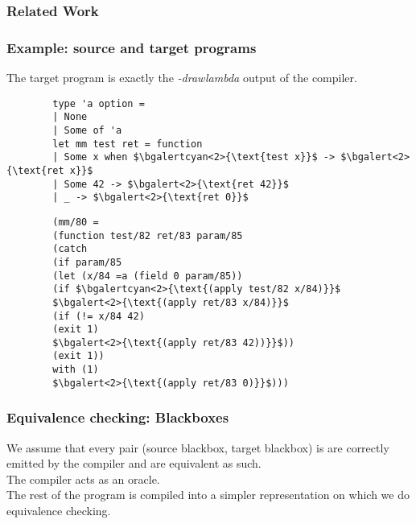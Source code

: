 \documentclass{beamer}
\begin{document}
\begin{frame}
  \frametitle{Related Work}
\end{frame}

\begin{frame}[fragile]
  \frametitle{Example: source and target programs}
  The target program is exactly the \emph{-drawlambda} output of the compiler.

  \begin{small}
    \hspace{-1em}
    \begin{minipage}{0.36\linewidth}
      \begin{lstlisting}
        type 'a option =
        | None
        | Some of 'a
        let mm test ret = function
        | Some x when $\bgalertcyan<2>{\text{test x}}$ -> $\bgalert<2>{\text{ret x}}$
        | Some 42 -> $\bgalert<2>{\text{ret 42}}$
        | _ -> $\bgalert<2>{\text{ret 0}}$
      \end{lstlisting}
    \end{minipage}
    \hfill
    \begin{minipage}{0.64\linewidth}
      \begin{lstlisting}
        (mm/80 =
        (function test/82 ret/83 param/85
        (catch
        (if param/85
        (let (x/84 =a (field 0 param/85))
        (if $\bgalertcyan<2>{\text{(apply test/82 x/84)}}$
        $\bgalert<2>{\text{(apply ret/83 x/84)}}$
        (if (!= x/84 42)
        (exit 1)
        $\bgalert<2>{\text{(apply ret/83 42))}}$))
        (exit 1))
        with (1)
        $\bgalert<2>{\text{(apply ret/83 0)}}$)))
      \end{lstlisting}
    \end{minipage}
  \end{small}
  \pause
\end{frame}

\begin{frame}
  \frametitle{Equivalence checking: Blackboxes}
  We assume that every pair (source blackbox, target blackbox) is are correctly emitted
  by the compiler and are equivalent as such. \\
  The compiler acts as an oracle. \\
  The rest of the program is compiled into a simpler representation on which we do equivalence checking. 

\end{frame}
\end{document}
